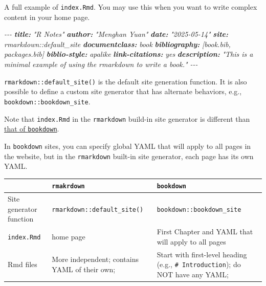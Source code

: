 \documentclass[
  a4paper,
  twoside,
  openright]{book}
\newenvironment{Shaded}{\begin{snugshade}}{\end{snugshade}}
\newcommand{\AnnotationTok}[1]{\textcolor[rgb]{0.56,0.35,0.01}{\textbf{\textit{#1}}}}
\newcommand{\CommentTok}[1]{\textcolor[rgb]{0.56,0.35,0.01}{\textit{#1}}}
\theoremstyle{definition}
\theoremstyle{definition}
\theoremstyle{definition}
\theoremstyle{definition}
\theoremstyle{remark}
\begin{document}
A full example of \texttt{index.Rmd}. You may use this when you want to write complex content in your home page.

\begin{Shaded}
\begin{Highlighting}[]
\CommentTok{{-}{-}{-}}
\AnnotationTok{title:}\CommentTok{ "R Notes"}
\AnnotationTok{author:}\CommentTok{ "Menghan Yuan"}
\AnnotationTok{date:}\CommentTok{ "2025{-}05{-}14"}
\AnnotationTok{site:}\CommentTok{ rmarkdown::default\_site}
\AnnotationTok{documentclass:}\CommentTok{ book}
\AnnotationTok{bibliography:}\CommentTok{ [book.bib, packages.bib]}
\AnnotationTok{biblio{-}style:}\CommentTok{ apalike}
\AnnotationTok{link{-}citations:}\CommentTok{ yes}
\AnnotationTok{description:}\CommentTok{ "This is a minimal example of using}
\CommentTok{  the rmarkdown to write a book."}
\CommentTok{{-}{-}{-}}
\end{Highlighting}
\end{Shaded}

\texttt{rmarkdown::default\_site()} is the default site generation function. It is also possible to define a custom site generator that has alternate behaviors, e.g., \texttt{bookdown::bookdown\_site}.

Note that \texttt{index.Rmd} in the \texttt{rmarkdown} build-in site generator is different than \href{https://bookdown.org/yihui/rmarkdown/bookdown-project.html\#index-file}{that of \texttt{bookdown}}.

In \texttt{bookdown} sites, you can specify global YAML that will apply to all pages in the website, but in the \texttt{rmarkdown} built-in site generator, each page has its own YAML.

\begin{longtable}[]{@{}
  >{\raggedright\arraybackslash}p{}
  >{\raggedright\arraybackslash}p{}
  >{\raggedright\arraybackslash}p{}@{}}
\toprule\noalign{}
\begin{minipage}[b]{\linewidth}\raggedright
\end{minipage} & \begin{minipage}[b]{\linewidth}\raggedright
\texttt{rmakrdown}
\end{minipage} & \begin{minipage}[b]{\linewidth}\raggedright
\texttt{bookdown}
\end{minipage} \\
\midrule\noalign{}
\endhead
\bottomrule\noalign{}
\endlastfoot
Site generator function & \texttt{rmarkdown::default\_site()} & \texttt{bookdown::bookdown\_site} \\
\texttt{index.Rmd} & home page & First Chapter and YAML that will apply to all pages \\
Rmd files & More independent; contains YAML of their own; & Start with first-level heading (e.g., \texttt{\#\ Introduction}); do NOT have any YAML; \\
\end{longtable}
\end{document}
